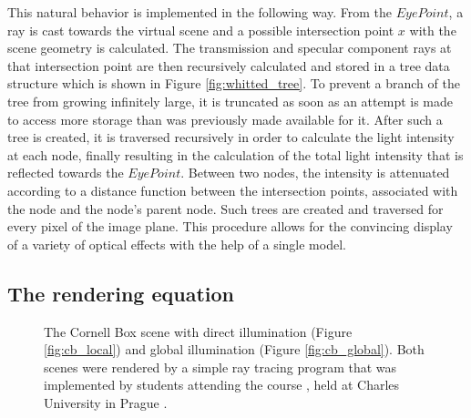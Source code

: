This natural behavior is implemented in the following way. From the $Eye Point$, a ray is cast towards the virtual scene and a possible intersection point $x$ with the scene geometry is calculated. 
The transmission and specular component rays at that intersection point are then recursively calculated and stored in a tree data structure which is shown in Figure \ref{fig:whitted_tree}. 
To prevent a branch of the tree from growing infinitely large, it is truncated as soon as an attempt is made to access more storage than was previously made available for it. After such a tree is created, it is traversed recursively in order to calculate the light intensity at each node, finally resulting in the calculation of the total light intensity that is reflected towards the $Eye Point$. Between two nodes, the intensity is attenuated according to a distance function between the intersection points, associated with the node and the node's parent node. 
Such trees are created and traversed for every pixel of the image plane. This procedure allows for the convincing display of a variety of optical effects with the help of a single model.

\subsection{The rendering equation}

\begin{figure}
	\centering
	\hfil
	\caption{The Cornell Box scene with direct illumination (Figure \ref{fig:cb_local}) and global illumination (Figure \ref{fig:cb_global}). Both scenes were rendered by a simple ray tracing program that was implemented by students attending the course , held at Charles University in Prague \cite{cg3}.}
\end{figure}

